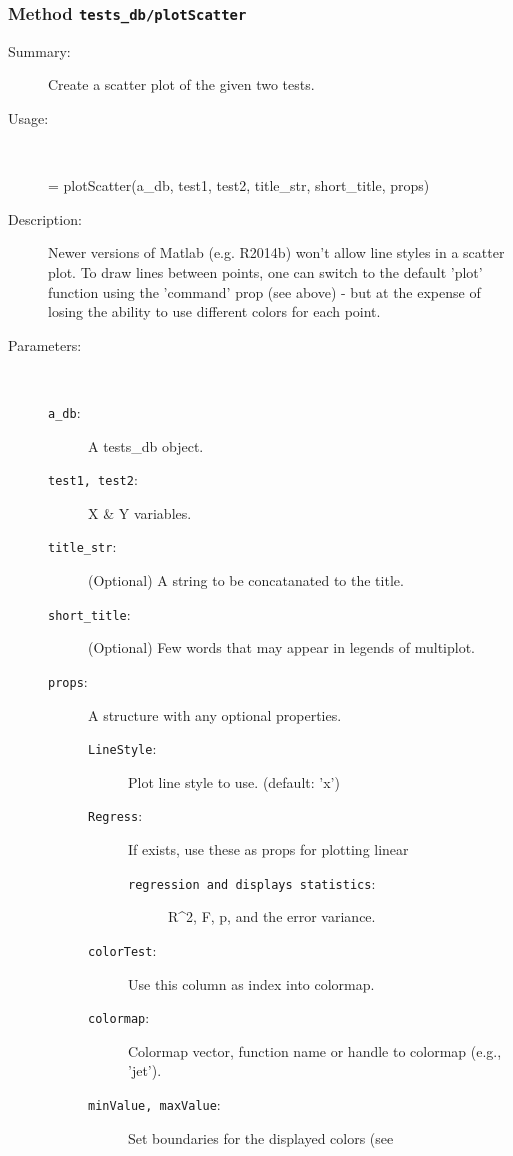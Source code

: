 \subsubsection[Method \texttt{plotScatter}]{Method \texttt{tests\_db/plotScatter}}%
%
\label{ref_tests_db__plotScatter}%
\hypertarget{ref_tests_db__plotScatter}{}%
\begin{description}
\item[Summary:]Create a scatter plot of the given two tests.
%
\item[Usage:]~%
\begin{lyxcode}%
[a\_p, b] = plotScatter(a\_db, test1, test2, title\_str, short\_title, props)
%
\end{lyxcode}%
%
\item[Description:]%
Newer versions of Matlab (e.g. R2014b) won't allow line styles in
 a scatter plot. To draw lines between points, one can switch to the
 default 'plot' function using the 'command' prop (see above) - but at
 the expense of losing the ability to use different colors for each point.
\item[Parameters:]~
\begin{description}%
\item[\texttt{a\_db}:]
 A tests\_db object.
\item[\texttt{test1, test2}:]
 X \& Y variables.
\item[\texttt{title\_str}:]
 (Optional) A string to be concatanated to the title.
\item[\texttt{short\_title}:]
 (Optional) Few words that may appear in legends of multiplot.
\item[\texttt{props}:]
 A structure with any optional properties.
\begin{description}%
\item[\texttt{LineStyle}:]
 Plot line style to use. (default: 'x')
\item[\texttt{Regress}:]
 If exists, use these as props for plotting linear
\begin{description}%
\item[\texttt{regression and displays statistics}:]
 R\textasciicircum{}2, F, p, and the error variance. 
\end{description}%
\item[\texttt{colorTest}:]
 Use this column as index into colormap.
\item[\texttt{colormap}:]
 Colormap vector, function name or handle to colormap (e.g., 'jet').
\item[\texttt{minValue, maxValue}:]
 Set boundaries for the displayed colors (see


\end{description}
\end{description}
\end{description}
